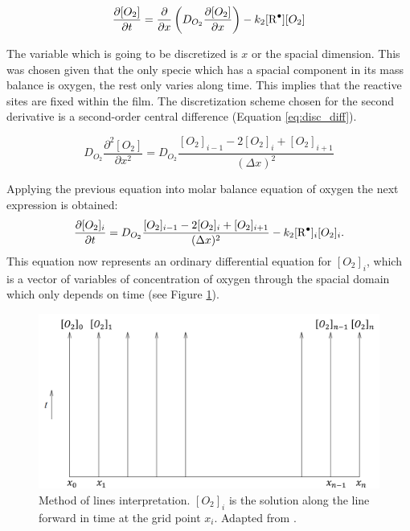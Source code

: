 \begin{refsection}
\begin{equation*}
     \frac{\partial [O_2]}{\partial t}= \frac{\partial}{\partial x} \left(D_{O_2}\frac{\partial [O_2] }{\partial x}\right) -k_2[\ce{R^.}][O_2]
\end{equation*}

The variable which is going to be discretized is $x$ or the spacial dimension. This was chosen given that the only specie which has a spacial component in its mass balance is oxygen, the rest only varies along time. This implies that the reactive sites are fixed within the film. The discretization scheme chosen for the second derivative is a second-order central difference  (Equation \ref{eq:disc_diff}). 

\begin{equation}
    D_{O_2}\frac{\partial^2 [O_2]}{\partial x^2}= D_{O_2} \frac{[O_2]_{i-1}-2[O_2]_{i}+[O_2]_{i+1}}{(\Delta x)^2}
    \label{eq:disc_diff}
\end{equation}

Applying the previous equation into molar balance equation of oxygen the next expression is obtained:
\begin{equation}
     \frac{\partial [O_2]_i}{\partial t}=  D_{O_2} \frac{[O_2]_{i-1}-2[O_2]_{i}+[O_2]_{i+1}}{(\Delta x)^2} -k_2[\ce{R^.}]_i[O_2]_i.
     \label{eq:LOD_oxygen}
\end{equation}
This equation now represents an ordinary differential equation for $[O_2]_i$, which is a vector of variables of concentration of oxygen through the spacial domain which only depends on time (see Figure \ref{fig:LOD_diagram}).

\begin{figure}[ht]
    \centering
    \includegraphics[width=0.7 \linewidth]{Documento_Latex/Imagenes/LOD.png}
    \caption{Method of lines interpretation. $[O_2]_i$ is the solution along the line forward in time at the grid point $x_i$. Adapted from \cite{LeVeque2007FiniteProblems}.}
    \label{fig:LOD_diagram}
\end{figure}


\end{refsection}
